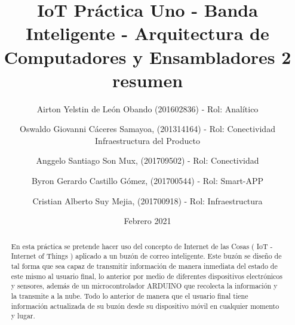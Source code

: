\documentclass[osajnl,twocolumn,showpacs,superscriptaddress,10pt]{revtex4-1}
\begin{document}

\title{\Huge IoT Práctica Uno -  Banda Inteligente - Arquitectura de Computadores y Ensambladores 2 }

\author{\newline Airton Yelstin de León Obando (201602836) - Rol: Analítico}
%

\author{\newline Oswaldo Giovanni Cáceres Samayoa, (201314164) - Rol: Conectividad Infraestructura del Producto}%
%
\author{\newline Anggelo Santiago Son Mux, (201709502) - Rol: Conectividad}%
%
\author{\newline Byron Gerardo Castillo Gómez, (201700544) - Rol: Smart-APP}%
%
\author{\newline Cristian Alberto Suy Mejia, (201700918) - Rol: Infraestructura}%
%
\date{Febrero 2021}



\begin{abstract}
\title {resumen}
En esta pr\'actica se pretende hacer uso del concepto de Internet de las Cosas ( IoT - Internet of Things ) aplicado a un buz\'on de correo inteligente. Este buz\'on se diseño de tal forma que sea capaz de transmitir informaci\'on de manera inmediata del estado de este mismo al usuario final, lo anterior por medio de diferentes dispositivos electrónicos y sensores, adem\'as de un microcontrolador ARDUINO que recolecta la informaci\'on y la transmite a la nube. Todo lo anterior de manera que el usuario final tiene informaci\'on actualizada de su buz\'on desde su dispositivo m\'ovil en cualquier momento y lugar.
\end{abstract}
\maketitle{}
\end{document}
